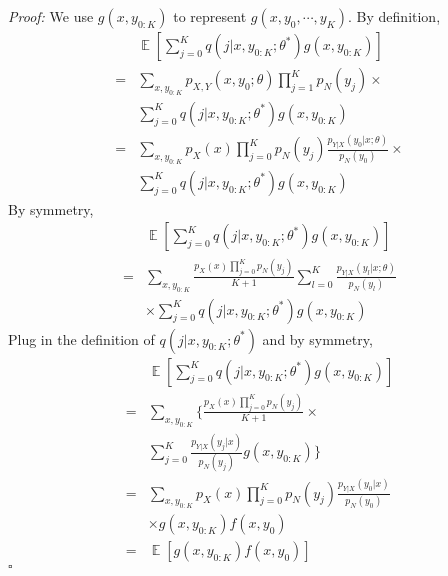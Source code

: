 \documentclass[11pt,a4paper]{article}
\newcommand{\qed}{\square}
\DeclareMathOperator{\E}{\mathbb{E}}
\newcommand{\q}[1]{q(#1|x, y_{0:K}; \theta^*)}
\begin{document}
{\em Proof: }
We use $g(x, y_{0:K})$ to represent $g(x, y_0, \cdots, y_K)$. By definition, 
\begin{equation*}
\begin{aligned}
    & \E \left[  \sum_{j=0}^K \q{j} g(x, y_{0:K})  \right]\\
   = & \sum_{x,y_{0:K}} p_{X,Y}(x, y_0; \theta) \prod_{j=1}^K p_N(y_j) \times \\
   &  \sum_{j=0}^K \q{j} g(x, y_{0:K}) \\
   = & \sum_{x,y_{0:K}} p_{X}(x) \prod_{j=0}^K p_N(y_j) \frac{p_{Y|X}(y_0|x; \theta)}{p_N(y_0)}\times \\
   & \sum_{j=0}^K \q{j} g(x, y_{0:K})
\end{aligned}
\end{equation*}
By symmetry, 
\begin{equation*}
\begin{aligned}
   & \E \left[  \sum_{j=0}^K \q{j} g(x, y_{0:K})  \right]\\
   = & \sum_{x,y_{0:K}}  \frac{p_{X}(x)\prod_{j=0}^K p_N(y_j) }{K+1} \sum_{l=0}^{K}\frac{p_{Y|X}(y_l|x; \theta)}{p_N(y_l)} \\
   & \times  \sum_{j=0}^K \q{j} g(x, y_{0:K})
\end{aligned}
\end{equation*}
Plug in the definition of $\q{j}$ and by symmetry, 
\begin{equation*}
\begin{aligned}
   & \E \left[  \sum_{j=0}^K \q{j} g(x, y_{0:K})  \right]\\
   = & \sum_{x,y_{0:K}} \Big\{ \frac{p_{X}(x)\prod_{j=0}^K p_N(y_j) }{K+1} \times \\
   &  \sum_{j=0}^K \frac{p_{Y|X}(y_j|x)}{p_N(y_j)} g(x, y_{0:K})\Big\} \\
   = & \sum_{x,y_{0:K}} p_{X}(x) \prod_{j=0}^K p_N(y_j) \frac{p_{Y|X}(y_0|x)}{p_N(y_0)} \\ 
   & \times g(x, y_{0:K})f(x, y_0)\\
  = & \E \left[g(x, y_{0:K})f(x, y_0) \right]
\end{aligned}
\end{equation*}
$\qed$
\end{document}
